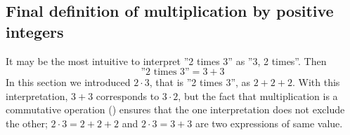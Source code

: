 \subsection*{Final definition of multiplication by positive integers}
It may be the most intuitive to interpret ''2 times 3'' as ''3, 2 times''. Then
\[ \text{''2 times 3''}=3+3 \]
In this section we introduced $ {2\cdot3} $, that is ''2 times 3'', as $ {2+2+2} $. With this interpretation, $ {3+3} $ corresponds to $ {3\cdot2} $, but the fact that multiplication is a commutative operation () ensures that the one interpretation does not exclude the other; $ {2\cdot3 =2+2+2} $ and $ {2\cdot3=3+3} $ are two expressions of same value.\regv




